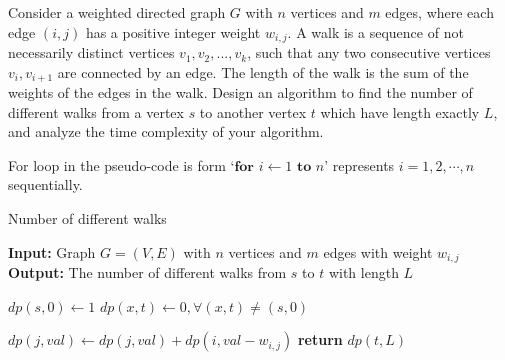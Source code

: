 \problem{}
Consider a weighted directed graph $G$ with $n$ vertices and $m$ edges, where each edge $(i,j)$ has a positive integer weight $w_{i, j}$. A  walk is a sequence of not necessarily distinct vertices $v_1, v_2, ..., v_k$, such that any two consecutive vertices $v_i, v_{i+1}$ are connected by an edge. The length of the walk is the sum of the weights of the edges in the walk.  Design an algorithm to find the number of different walks from a vertex $s$ to another vertex $t$ which have length exactly $L$, and analyze the time complexity of your algorithm. 

\solution{}





For loop in the pseudo-code is form `$\textbf{for } i \gets 1 \textbf{ to } n$' represents $i=1,2,\cdots,n$ sequentially.
\begin{algorithm}
    \caption{Number of different walks}\label{alg:problem-6}
    \begin{algorithmic}[1]
    \State \textbf{Input:} Graph $G=(V,E)$ with $n$ vertices and $m$ edges with weight $w_{i,j}$
    \State \textbf{Output:} The number of different walks from $s$ to $t$ with length $L$
    
    \State $dp(s,0) \gets 1$
    \State $dp(x,t) \gets 0, \forall (x,t)\neq (s,0)$
    
            \State $dp(j,val) \gets dp(j,val)+dp(i, val-w_{i,j})$
        \EndFor
    \EndFor
    \State \textbf{return} $dp(t,L)$
    \end{algorithmic}
\end{algorithm}






